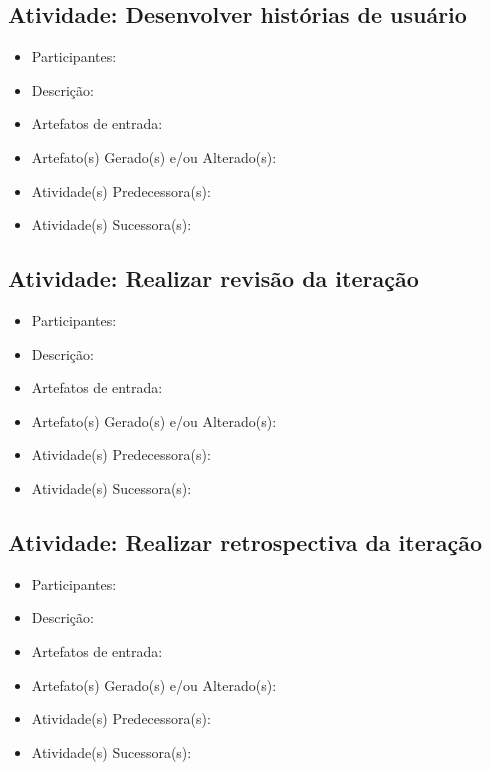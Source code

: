 \subsection{Atividade: Desenvolver histórias de usuário}
\begin{itemize}
\item Participantes: 

\item Descrição: 

\item Artefatos de entrada: 

\item Artefato(s) Gerado(s) e/ou Alterado(s): 

\item Atividade(s) Predecessora(s): 
  
\item Atividade(s) Sucessora(s): 
\end{itemize}

\subsection{Atividade: Realizar revisão da iteração}
\begin{itemize}
\item Participantes: 

\item Descrição: 

\item Artefatos de entrada: 

\item Artefato(s) Gerado(s) e/ou Alterado(s): 

\item Atividade(s) Predecessora(s): 
  
\item Atividade(s) Sucessora(s): 
\end{itemize}

\subsection{Atividade: Realizar retrospectiva da iteração}
\begin{itemize}
\item Participantes: 

\item Descrição: 

\item Artefatos de entrada: 

\item Artefato(s) Gerado(s) e/ou Alterado(s): 

\item Atividade(s) Predecessora(s): 
  
\item Atividade(s) Sucessora(s): 
\end{itemize}

